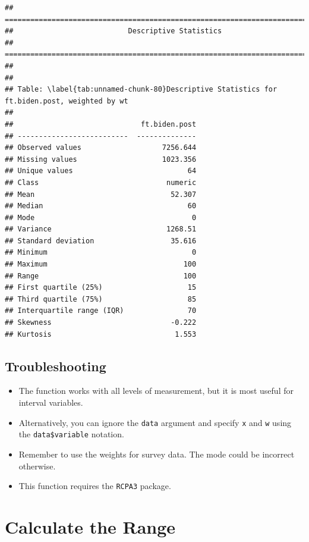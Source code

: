 \documentclass[
]{book}
\providecommand{\tightlist}{%
  \setlength{\itemsep}{0pt}\setlength{\parskip}{0pt}}
\begin{document}
\begin{verbatim}
## ===========================================================================
##                           Descriptive Statistics
## ===========================================================================
## 
## 
## Table: \label{tab:unnamed-chunk-80}Descriptive Statistics for ft.biden.post, weighted by wt
## 
##                              ft.biden.post
## --------------------------  --------------
## Observed values                   7256.644
## Missing values                    1023.356
## Unique values                           64
## Class                              numeric
## Mean                                52.307
## Median                                  60
## Mode                                     0
## Variance                           1268.51
## Standard deviation                  35.616
## Minimum                                  0
## Maximum                                100
## Range                                  100
## First quartile (25%)                    15
## Third quartile (75%)                    85
## Interquartile range (IQR)               70
## Skewness                            -0.222
## Kurtosis                             1.553
\end{verbatim}

\hypertarget{troubleshooting-30}{%
\subsection{Troubleshooting}\label{troubleshooting-30}}

\begin{itemize}
\tightlist
\item
  The function works with all levels of measurement, but it is most useful for interval variables.
\item
  Alternatively, you can ignore the \texttt{data} argument and specify \texttt{x} and \texttt{w} using the \texttt{data\$variable} notation.
\item
  Remember to use the weights for survey data. The mode could be incorrect otherwise.
\item
  This function requires the \texttt{RCPA3} package.
\end{itemize}

\hypertarget{range}{%
\section{Calculate the Range}\label{range}}
\end{document}
